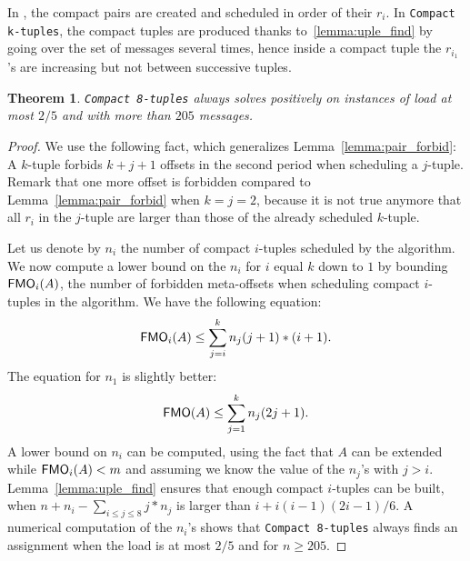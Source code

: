 \documentclass[pdflatex,sn-mathphys,iicol]{sn-jnl}%
\theoremstyle{thmstyleone}%
\newtheorem{theorem}{Theorem}%
\theoremstyle{thmstyletwo}%
\theoremstyle{thmstylethree}%
\begin{document}
In \compactpair, the compact pairs are created and scheduled in order of their $r_i$. In \texttt{Compact k-tuples}, the compact tuples are produced thanks to~\ref{lemma:uple_find} by going over the set of messages several times, hence inside a compact tuple the $r_{i_1}$'s are increasing but not
between successive tuples. 


\begin{theorem}\label{th:k-tuples}
\texttt{Compact 8-tuples} always solves \pma positively on instances of load at most $2/5$ and with more than $205$ messages.
\end{theorem}
\begin{proof}
We use the following fact, which generalizes Lemma~\ref{lemma:pair_forbid}: A $k$-tuple forbids $k+j+1$ offsets in the second period when scheduling a $j$-tuple. Remark that one more offset is forbidden compared to Lemma~\ref{lemma:pair_forbid} when $k = j = 2$, because it is not true anymore that all
$r_i$ in the $j$-tuple are larger than those of the already scheduled $k$-tuple.

Let us denote by $n_i$ the number of compact $i$-tuples scheduled by the algorithm. We now compute a lower bound on the $n_i$ for $i$ equal $k$ down to $1$ by bounding $\textsf{FMO}_i(A)$, the number of forbidden meta-offsets when scheduling compact $i$-tuples in the algorithm. 
We have the following equation:  $$ \textsf{FMO}_i(A) \leq \displaystyle{\sum_{j=i}^k n_j(j+1)*(i+1)}.$$
The equation for $n_1$ is slightly better: 
$$ \textsf{FMO}(A) \leq \displaystyle{\sum_{j=1}^k n_j(2j + 1)}.$$
A lower bound on $n_i$ can be computed, using the fact that $A$ can be extended while $\textsf{FMO}_i(A) < m$ and assuming we know the value of the $n_j$'s with $j > i$. 
Lemma~\ref{lemma:uple_find} ensures that enough compact $i$-tuples can be built, when $n + n_i - \sum_{i \leq j \leq 8} j*n_j$ is larger than $i + i(i-1)(2i-1)/6$. 
A numerical computation of the $n_i$'s shows that \texttt{Compact 8-tuples} always finds an assignment when the load is at most $2/5$ and for $n \geq 205$.
\end{proof}
\end{document}
